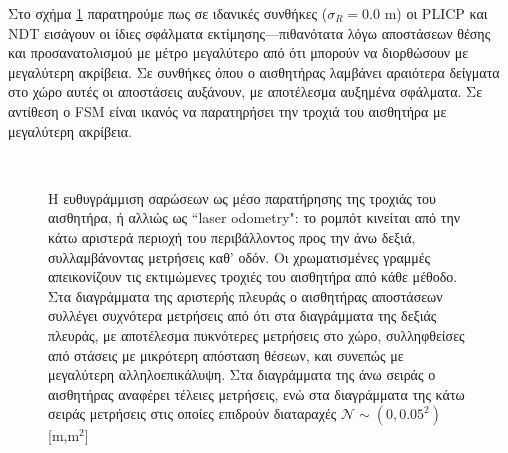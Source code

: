 Στο σχήμα \ref{fig:02_05_04:02} παρατηρούμε πως σε ιδανικές συνθήκες ($\sigma_R
= 0.0$ m) οι PLICP και NDT εισάγουν οι ίδιες σφάλματα εκτίμησης---πιθανότατα
λόγω αποστάσεων θέσης και προσανατολισμού με μέτρο μεγαλύτερο από ότι μπορούν
να διορθώσουν με μεγαλύτερη ακρίβεια. Σε συνθήκες όπου ο αισθητήρας λαμβάνει
αραιότερα δείγματα στο χώρο αυτές οι αποστάσεις αυξάνουν, με αποτέλεσμα
αυξημένα σφάλματα. Σε αντίθεση ο FSM είναι ικανός να παρατηρήσει την τροχιά του
αισθητήρα με μεγαλύτερη ακρίβεια.

\begin{figure}[]\centering
  \begin{subfigure}{\linewidth}
    
  \end{subfigure}\\ \vspace{-5cm}
  \begin{subfigure}{\linewidth}
    
  \end{subfigure}
  \vspace{-2cm}
  \caption{\small Η ευθυγράμμιση σαρώσεων ως μέσο παρατήρησης της τροχιάς του
           αισθητήρα, ή αλλιώς ως ``laser odometry": το ρομπότ κινείται από
           την κάτω αριστερά περιοχή του περιβάλλοντος προς την άνω δεξιά,
           συλλαμβάνοντας μετρήσεις καθ' οδόν. Οι χρωματισμένες γραμμές
           απεικονίζουν τις εκτιμώμενες τροχιές του αισθητήρα από κάθε μέθοδο.
           Στα διαγράμματα της αριστερής πλευράς ο αισθητήρας αποστάσεων
           συλλέγει συχνότερα μετρήσεις από ότι στα διαγράμματα της δεξιάς
           πλευράς, με αποτέλεσμα πυκνότερες μετρήσεις στο χώρο, συλληφθείσες
           από στάσεις με μικρότερη απόσταση θέσεων, και συνεπώς με
           μεγαλύτερη αλληλοεπικάλυψη. Στα διαγράμματα της άνω σειράς ο
           αισθητήρας αναφέρει τέλειες μετρήσεις, ενώ στα διαγράμματα της κάτω
           σειράς μετρήσεις στις οποίες επιδρούν διαταραχές
           $\mathcal{N}\sim(0,0.05^2)$ [m,m$^2$]}
  \label{fig:02_05_04:02}
\end{figure}

